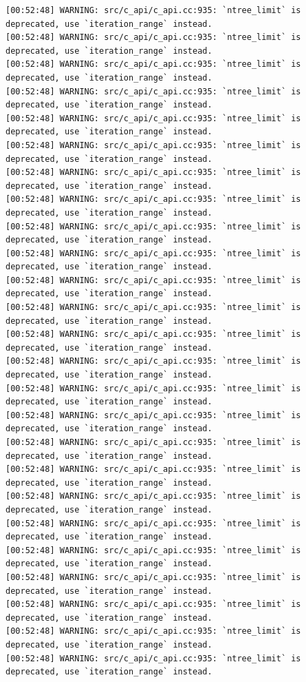 \documentclass[
  letterpaper,
  DIV=11,
  numbers=noendperiod]{scrartcl}
\begin{document}
\begin{verbatim}
[00:52:48] WARNING: src/c_api/c_api.cc:935: `ntree_limit` is deprecated, use `iteration_range` instead.
[00:52:48] WARNING: src/c_api/c_api.cc:935: `ntree_limit` is deprecated, use `iteration_range` instead.
[00:52:48] WARNING: src/c_api/c_api.cc:935: `ntree_limit` is deprecated, use `iteration_range` instead.
[00:52:48] WARNING: src/c_api/c_api.cc:935: `ntree_limit` is deprecated, use `iteration_range` instead.
[00:52:48] WARNING: src/c_api/c_api.cc:935: `ntree_limit` is deprecated, use `iteration_range` instead.
[00:52:48] WARNING: src/c_api/c_api.cc:935: `ntree_limit` is deprecated, use `iteration_range` instead.
[00:52:48] WARNING: src/c_api/c_api.cc:935: `ntree_limit` is deprecated, use `iteration_range` instead.
[00:52:48] WARNING: src/c_api/c_api.cc:935: `ntree_limit` is deprecated, use `iteration_range` instead.
[00:52:48] WARNING: src/c_api/c_api.cc:935: `ntree_limit` is deprecated, use `iteration_range` instead.
[00:52:48] WARNING: src/c_api/c_api.cc:935: `ntree_limit` is deprecated, use `iteration_range` instead.
[00:52:48] WARNING: src/c_api/c_api.cc:935: `ntree_limit` is deprecated, use `iteration_range` instead.
[00:52:48] WARNING: src/c_api/c_api.cc:935: `ntree_limit` is deprecated, use `iteration_range` instead.
[00:52:48] WARNING: src/c_api/c_api.cc:935: `ntree_limit` is deprecated, use `iteration_range` instead.
[00:52:48] WARNING: src/c_api/c_api.cc:935: `ntree_limit` is deprecated, use `iteration_range` instead.
[00:52:48] WARNING: src/c_api/c_api.cc:935: `ntree_limit` is deprecated, use `iteration_range` instead.
[00:52:48] WARNING: src/c_api/c_api.cc:935: `ntree_limit` is deprecated, use `iteration_range` instead.
[00:52:48] WARNING: src/c_api/c_api.cc:935: `ntree_limit` is deprecated, use `iteration_range` instead.
[00:52:48] WARNING: src/c_api/c_api.cc:935: `ntree_limit` is deprecated, use `iteration_range` instead.
[00:52:48] WARNING: src/c_api/c_api.cc:935: `ntree_limit` is deprecated, use `iteration_range` instead.
[00:52:48] WARNING: src/c_api/c_api.cc:935: `ntree_limit` is deprecated, use `iteration_range` instead.
[00:52:48] WARNING: src/c_api/c_api.cc:935: `ntree_limit` is deprecated, use `iteration_range` instead.
[00:52:48] WARNING: src/c_api/c_api.cc:935: `ntree_limit` is deprecated, use `iteration_range` instead.
[00:52:48] WARNING: src/c_api/c_api.cc:935: `ntree_limit` is deprecated, use `iteration_range` instead.
[00:52:48] WARNING: src/c_api/c_api.cc:935: `ntree_limit` is deprecated, use `iteration_range` instead.
[00:52:48] WARNING: src/c_api/c_api.cc:935: `ntree_limit` is deprecated, use `iteration_range` instead.

\end{verbatim}
\end{document}
